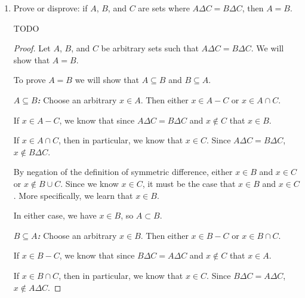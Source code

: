 \documentclass{article}
\renewcommand{\(}{\left(}
\renewcommand{\)}{\right)}
\renewcommand{\emph}[1]{\textit{\textbf{#1}}}
\theoremstyle{plain}
\theoremstyle{plain}
\theoremstyle{definition}
\begin{document}
\begin{enumerate}[label*=\roman*.,ref=\roman*]
\begin{shaded}
\begin{proof}
Then, because $\wp(B) \subseteq \wp(A)$, we know that $T \in \wp(A)$.

By the definition of the power set, $T \subseteq B$. Since $T \subseteq B$ and $x \in T$, we know that $x \in B$. Likewise, since $T \subseteq A$ and $x \in T$, we know that $x \in A$. Therefore, we have shown that $x \in A$, as required to show that $B \subseteq A$.


Because we have demonstrated that $A \subseteq B$ and $B \subseteq A$, we conclude that $A = B$, as required.
\end{proof}
\end{shaded}

\item Prove or disprove: if $A$, $B$, and $C$ are sets where $A \Delta C = B \Delta C$, then $A = B$.

\begin{shaded}
TODO

\begin{proof}
	Let $A$, $B$, and $C$ be arbitrary sets such that $A \Delta C = B \Delta C$. We will show that $A = B$.
	
	To prove $A = B$ we will show that $A \subseteq B$ and $B \subseteq A$.
	
	\emph{$A \subseteq B$:} Choose an arbitrary $x \in A$. Then either $x \in A - C$ or $x \in A \cap C$.
	
	If $x \in A - C$, we know that since $A \Delta C = B \Delta C$ and $x \notin C$ that $x \in B$.
	
	If $x \in A \cap C$, then in particular, we know that $x \in C$. Since $A \Delta C = B \Delta C$, $x \notin B \Delta C$. 
	
	By negation of the definition of symmetric difference, either $x \in B$ and $x \in C$ or $x \notin B \cup C$. Since we know $x \in C$, it must be the case that $x \in B$ and $x \in C$. More specifically, we learn that $x \in B$.
	
	In either case, we have $x \in B$, so $A \subset B$.
	
	\emph{$B \subseteq A$:} Choose an arbitrary $x \in B$. 
	Then either $x \in B - C$ or $x \in B \cap C$.
	
	If $x \in B - C$, we know that since $B \Delta C = A \Delta C$ and $x \notin C$ that $x \in A$.
	
	If $x \in B \cap C$, then in particular, we know that $x \in C$. Since $B \Delta C = A \Delta C$, $x \notin A \Delta C$. 
	

\end{proof}
\end{shaded}
\end{enumerate}
\end{document}
